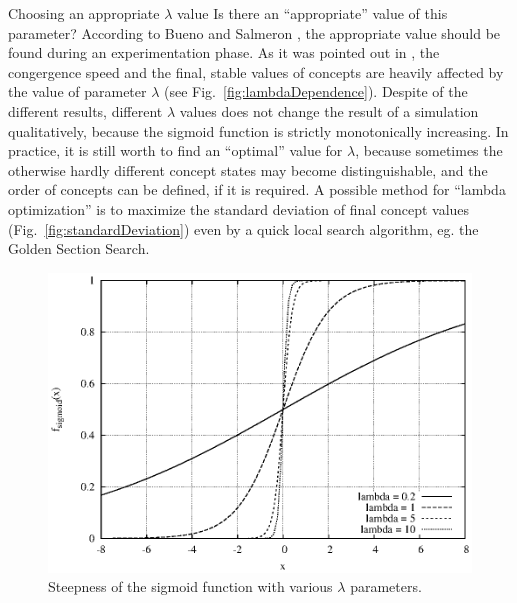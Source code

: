 \documentclass[graybox]{svmult}
\begin{document}
\begin{backgroundinformation}{Choosing an appropriate $\lambda$ value}
Is there an ``appropriate'' value of this parameter? According to Bueno and Salmeron \cite{buenoActivation}, the appropriate value should be found during an experimentation phase. As it was pointed out in \cite{hatwagnerm.f.koczyl.t.2015,parameterDependence}, the congergence speed and the final, stable values of concepts are heavily affected by the value of parameter $\lambda$ (see Fig.~\ref{fig:lambdaDependence}). Despite of the different results, different $\lambda$ values does not change the result of a simulation qualitatively, because the sigmoid function is strictly monotonically increasing. In practice, it is still worth to find an ``optimal'' value for $\lambda$, because sometimes the otherwise hardly different concept states may become distinguishable, and the order of concepts can be defined, if it is required. A possible method for ``lambda optimization'' is to maximize the standard deviation of final concept values (Fig.~\ref{fig:standardDeviation}) even by a quick local search algorithm, eg. the Golden Section Search.

\begin{figure}[hbt]
  \begin{center}
    \includegraphics[scale=.8]{lambdaSigmoid.eps}
  \end{center}
  \caption{Steepness of the sigmoid function with various $\lambda$ parameters.}
  \label{fig:lambdaSigmoid}
\end{figure}


\end{backgroundinformation}
\end{document}
